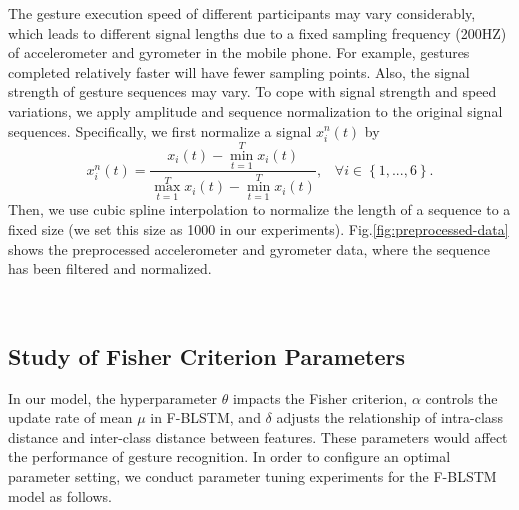 \documentclass[review]{elsarticle}
\begin{document}
The gesture execution speed of different participants may vary considerably, which leads to different signal lengths due to a fixed sampling frequency (200HZ) of accelerometer and gyrometer in the mobile phone. For example, gestures completed relatively faster will have fewer sampling points. Also, the signal strength of gesture sequences may vary. To cope with signal strength and speed variations, we apply amplitude and sequence normalization to the original signal sequences. Specifically, we first normalize a signal $x_i^n\left(t\right)$ by
\begin{equation}
	x_i^n\left( t \right) = \frac{{{x_i}\left( t \right) - \min _{t = 1}^T{x_i}\left( t \right)}}{{\max _{t = 1}^T{x_i}\left( t \right) - \min _{t = 1}^T{x_i}\left( t \right)}},\;\;\;
	\forall i \in \left\{ {1,...,6} \right\}.
	\label{eq:normalize}
\end{equation}
Then, we use cubic spline interpolation to normalize the length of a sequence to a fixed size (we set this size as 1000 in our experiments). Fig.\;\ref{fig:preprocessed-data} shows the preprocessed accelerometer and gyrometer data, where the sequence has been filtered and normalized.
\begin{figure*}[htbp]
	\normalsize
	\centering
	\\
	\caption{The preprocessed accelerometer and gyrometer data.}
	\label{fig:preprocessed-data}
	\vspace*{4pt}
\end{figure*}

\subsection{Study of Fisher Criterion Parameters}\label{sec:parameter}

In our model, the hyperparameter $\theta$ impacts the Fisher criterion, $\alpha$ controls the update rate of mean $\mu$ in F-BLSTM, and $\delta$ adjusts the relationship of intra-class distance and inter-class distance between features. These parameters would affect the performance of gesture recognition. In order to configure an optimal parameter setting, we conduct parameter tuning experiments for the F-BLSTM model as follows.
\end{document}
